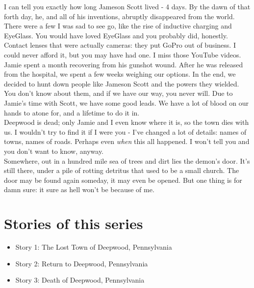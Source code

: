 \documentclass[a5paper]{scrartcl}
\begin{document}
I can tell you exactly how long Jameson Scott lived - 4 days. By the dawn of that forth day, he, and all of his inventions, abruptly disappeared from the world. There were a few I was sad to see go, like the rise of inductive charging and EyeGlass. You would have loved EyeGlass and you probably did, honestly.  Contact lenses that were actually cameras: they put GoPro out of business. I could never afford it, but you may have had one. I miss those YouTube videos. \\


Jamie spent a month recovering from his gunshot wound. After he was released from the hospital, we spent a few weeks weighing our options. In the end, we decided to hunt down people like Jameson Scott and the powers they wielded. You don't know about them, and if we have our way, you never will. Due to Jamie's time with Scott, we have some good leads. We have a lot of blood on our hands to atone for, and a lifetime to do it in. \\


Deepwood is dead; only Jamie and I even know where it is, so the town dies with us. I wouldn't try to find it if I were you - I've changed a lot of details: names of towns, names of roads. Perhaps even \textit{when}
 this all happened. I won't tell you and you don't want to know, anyway.\\


Somewhere, out in a hundred mile sea of trees and dirt lies the demon's door. It's still there, under a pile of rotting detritus that used to be a small church. The door may be found again someday, it may even be opened. But one thing is for damn sure: it sure as hell won't be because of me.

\clearpage
\section*{Stories of this series}

\begin{itemize}
    \item Story 1: The Lost Town of Deepwood, Pennsylvania
    \item Story 2: Return to Deepwood, Pennsylvania
    \item Story 3: Death of Deepwood, Pennsylvania
\end{itemize}
\end{document}
